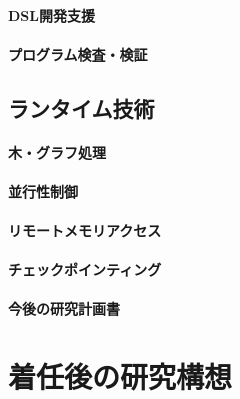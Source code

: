\documentclass[dvipdfmx]{jsarticle}
\begin{document}
\paragraph{DSL開発支援}

\cite{ppl23c3:satysfi_ted}
\cite{gpce14:libdsl}

\paragraph{プログラム検査・検証}
\cite{ppl21c3:mixed-size_genmc,ppl23c3:mixed-size_genmc}

\cite{ppl22:plags}
\cite{aplas16:pyblame}

\subsection*{ランタイム技術}

\paragraph{木・グラフ処理}

\cite{fhpc16:s6raph,jip21:hyper_gemini}
\cite{ijpp16:tree_skel,jssst16:nbody_locality,jssst14:par_traversal,pro19o:centaurus,jip20:centaurus}
\cite{adbis18:par_xpath,cloudcomp20:xpath}

\cite{ngc18:pregel}
\cite{ispass22:vipp}

\paragraph{並行性制御}
\cite{icpp15:htm,jip22:compth}

\paragraph{リモートメモリアクセス}
\cite{ipdrm20:menps,ispass21:ib_odp,jip22:argodsm,pro22o:far_memory,ppl23c3:far_memory,ppl23c3:redn}

\paragraph{チェックポインティング}
\cite{splash22:mvnb,ppl23:notebook}

\cite{jssst22:checkpoint}


\newpage
\begin{center}
\LARGE\bfseries 今後の研究計画書
\end{center}

\section*{着任後の研究構想}
\end{document}
